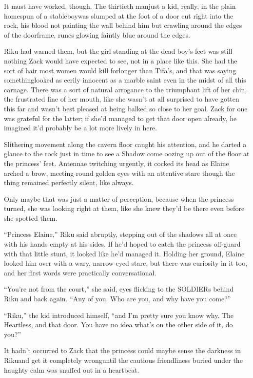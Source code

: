It must have worked, though. The thirtieth man\textemdash just a kid, really, in the plain homespun of a stableboy\textemdash was slumped at the foot of a door cut right into the rock, his blood not painting the wall behind him but crawling around the edges of the doorframe, runes glowing faintly blue around the edges.

Riku had warned them, but the girl standing at the dead boy's feet was still nothing Zack would have expected to see, not in a place like this. She had the sort of hair most women would kill for\textemdash longer than Tifa's, and that was saying something\textemdash looked as eerily innocent as a marble saint even in the midst of all this carnage. There was a sort of natural arrogance to the triumphant lift of her chin, the frustrated line of her mouth, like she wasn't at all surprised to have gotten this far and wasn't best pleased at being balked so close to her goal. Zack for one was grateful for the latter; if she'd managed to get that door open already, he imagined it'd probably be a lot more lively in here.

Slithering movement along the cavern floor caught his attention, and he darted a glance to the rock just in time to see a Shadow come oozing up out of the floor at the princess' feet. Antennae twitching urgently, it cocked its head as Elaine arched a brow, meeting round golden eyes with an attentive stare though the thing remained perfectly silent, like always.

Only maybe that was just a matter of perception, because when the princess turned, she was looking right at them, like she knew they'd be there even before she spotted them.

``Princess Elaine,'' Riku said abruptly, stepping out of the shadows all at once with his hands empty at his sides. If he'd hoped to catch the princess off-guard with that little stunt, it looked like he'd managed it. Holding her ground, Elaine looked him over with a wary, narrow-eyed stare, but there was curiosity in it too, and her first words were practically conversational.

``You're not from the court,'' she said, eyes flicking to the SOLDIERs behind Riku and back again. ``Any of you. Who are you, and why have you come?''

``Riku,'' the kid introduced himself, ``and I'm pretty sure you know why. The Heartless, and that door. You have no idea what's on the other side of it, do you?''

It hadn't occurred to Zack that the princess could maybe sense the darkness in Riku\textemdash and get it completely wrong\textemdash until the cautious friendliness buried under the haughty calm was snuffed out in a heartbeat.

